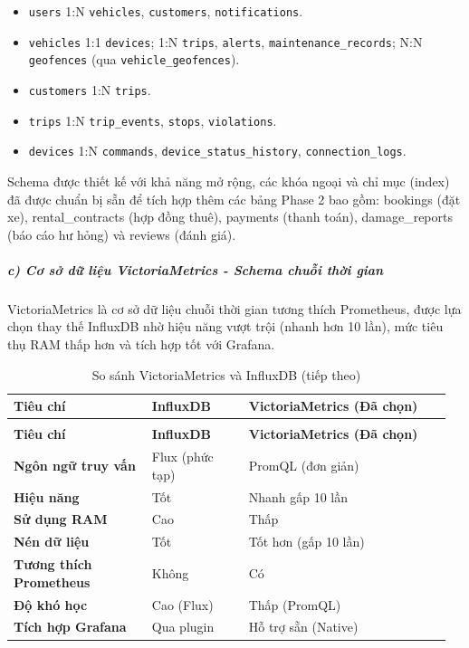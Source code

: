 \documentclass[a4paper]{extarticle}
\newcommand{\thesissettableid}[2]{%
  \renewcommand{\thetable}{#1}%
  \renewcommand{\theHtable}{#2}%
}
\providecommand{\tightlist}{%
  \setlength{\itemsep}{0pt}\setlength{\parskip}{0pt}}
\begin{document}
\begin{itemize}
\tightlist
\item
  \texttt{users} 1:N \texttt{vehicles}, \texttt{customers},
  \texttt{notifications}.
\item
  \texttt{vehicles} 1:1 \texttt{devices}; 1:N \texttt{trips},
  \texttt{alerts}, \texttt{maintenance\_records}; N:N \texttt{geofences}
  (qua \texttt{vehicle\_geofences}).
\item
  \texttt{customers} 1:N \texttt{trips}.
\item
  \texttt{trips} 1:N \texttt{trip\_events}, \texttt{stops},
  \texttt{violations}.
\item
  \texttt{devices} 1:N \texttt{commands}, \texttt{device\_status\_history},
  \texttt{connection\_logs}.
\end{itemize}

Schema được thiết kế với khả năng mở rộng, các khóa ngoại và chỉ mục
(index) đã được chuẩn bị sẵn để tích hợp thêm các bảng Phase 2 bao gồm:
bookings (đặt xe), rental\_contracts (hợp đồng thuê), payments (thanh
toán), damage\_reports (báo cáo hư hỏng) và reviews (đánh giá).

\subparagraph{c) Cơ sở dữ liệu VictoriaMetrics - Schema chuỗi thời
gian}\label{c-cux1a1-sux1edf-dux1eef-liux1ec7u-victoriametrics---schema-chuux1ed7i-thux1eddi-gian}

VictoriaMetrics là cơ sở dữ liệu chuỗi thời gian tương thích Prometheus,
được lựa chọn thay thế InfluxDB nhờ hiệu năng vượt trội (nhanh hơn 10
lần), mức tiêu thụ RAM thấp hơn và tích hợp tốt với Grafana.


{\thesissettableid{3.20}{tab-ch3-so-sanh-victoriametrics-va-influxdb}
\def\LTcaptype{table}
\begin{longtable}{|L{0.307\linewidth}|L{0.210\linewidth}|L{0.447\linewidth}|}
\caption{So sánh VictoriaMetrics và InfluxDB}\label{tab:ch3-so-sanh-victoriametrics-va-influxdb}\\
\hline \textbf{Tiêu chí} & \textbf{InfluxDB} & \textbf{VictoriaMetrics (Đã chọn)} \\
\hline
\endfirsthead
\caption[]{So sánh VictoriaMetrics và InfluxDB (tiếp theo)}\\
\hline \textbf{Tiêu chí} & \textbf{InfluxDB} & \textbf{VictoriaMetrics (Đã chọn)} \\
\hline
\endhead
\hline
\endfoot
\endlastfoot
\textbf{Ngôn ngữ truy vấn} & Flux (phức tạp) & PromQL (đơn giản) \\\hline
\textbf{Hiệu năng} & Tốt & Nhanh gấp 10 lần \\\hline
\textbf{Sử dụng RAM} & Cao & Thấp \\\hline
\textbf{Nén dữ liệu} & Tốt & Tốt hơn (gấp 10 lần) \\\hline
\textbf{Tương thích Prometheus} & Không & Có \\\hline
\textbf{Độ khó học} & Cao (Flux) & Thấp (PromQL) \\\hline
\textbf{Tích hợp Grafana} & Qua plugin & Hỗ trợ sẵn (Native) \\\hline
\end{longtable}
}
\end{document}
